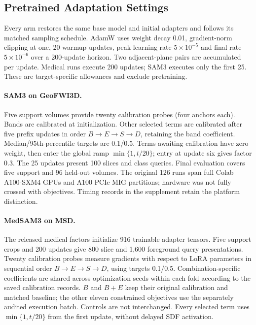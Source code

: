 \documentclass[12pt,a4paper]{article}
\begin{document}
\subsection{Pretrained Adaptation Settings}
\label{sec:adaptation-implementation}

Every arm restores the same base model and initial adapters and follows
its matched sampling schedule. AdamW uses weight decay 0.01,
gradient-norm clipping at one, 20 warmup updates, peak learning rate
$5\times10^{-5}$ and final rate $5\times10^{-6}$ over a 200-update
horizon. Two adjacent-plane pairs are accumulated per update.
Medical runs execute 200 updates; SAM3 executes only the first 25.
These are target-specific allowances and exclude pretraining.

\paragraph{SAM3 on GeoFWI3D.}\label{sec:sam3-methods-details}
Five support volumes provide twenty calibration probes (four anchors
each). Bands are calibrated at initialization. Other selected terms
are calibrated after five prefix updates in order $B\to E\to S\to D$,
retaining the band coefficient. Median/95th-percentile targets are
0.1/0.5. Terms awaiting calibration have zero weight, then enter the
global ramp $\min\{1,t/20\}$; entry at update six gives factor 0.3.
The 25 updates present 100 slices and class queries. Final evaluation
covers five support and 96 held-out volumes. The original 126 runs
span full Colab A100-SXM4 GPUs and A100 PCIe MIG partitions;
hardware was not fully crossed with objectives. Timing records in the
supplement retain the platform distinction.

\paragraph{MedSAM3 on MSD.}\label{sec:medsam-methods-details}
The released medical factors initialize 916 trainable adapter tensors.
Five support crops and 200 updates give 800 slice and 1,600 foreground
query presentations. Twenty calibration probes measure gradients with
respect to LoRA parameters in sequential order $B\to E\to S\to D$,
using targets 0.1/0.5. Combination-specific coefficients are shared
across optimization seeds within each fold according to the saved
calibration records. $B$ and $B+E$ keep their original calibration and
matched baseline; the other eleven constrained objectives use the
separately audited execution batch. Controls are not interchanged.
Every selected term uses $\min\{1,t/20\}$ from the first update,
without delayed SDF activation.
\end{document}
